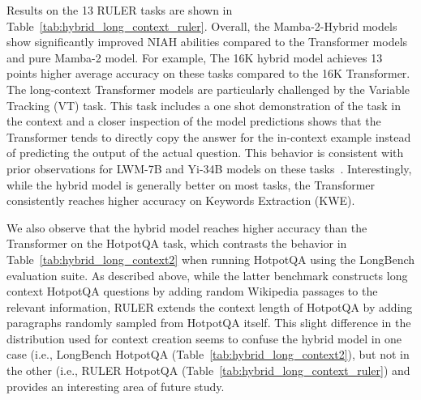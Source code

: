 Results on the 13 RULER tasks are shown in Table~\ref{tab:hybrid_long_context_ruler}. Overall, the Mamba-2-Hybrid models show significantly improved NIAH abilities compared to the Transformer models and pure Mamba-2 model. For example, The 16K hybrid model achieves 13 points higher average accuracy on these tasks compared to the 16K Transformer. The long-context Transformer models are particularly challenged by the Variable Tracking (VT) task. This task includes a one shot demonstration of the task in the context and a closer inspection of the model predictions shows that the Transformer tends to directly copy the answer for the in-context example instead of predicting the output of the actual question. This behavior is consistent with prior observations for LWM-7B and Yi-34B models on these tasks~\citep{hsieh2024ruler}. Interestingly, while the hybrid model is generally better on most tasks, the Transformer consistently reaches higher accuracy on Keywords Extraction (KWE). 

We also observe that the hybrid model reaches higher accuracy than the Transformer on the HotpotQA task, which contrasts the behavior in Table~\ref{tab:hybrid_long_context2} when running HotpotQA using the LongBench evaluation suite. As described above, while the latter benchmark constructs long context HotpotQA questions by adding random Wikipedia passages to the relevant information, RULER extends the context length of HotpotQA by adding paragraphs randomly sampled from HotpotQA itself. This slight difference in the distribution used for context creation seems to confuse the hybrid model in one case (i.e., LongBench HotpotQA (Table~\ref{tab:hybrid_long_context2}), but not in the other (i.e., RULER HotpotQA (Table~\ref{tab:hybrid_long_context_ruler}) and provides an interesting area of future study. 

